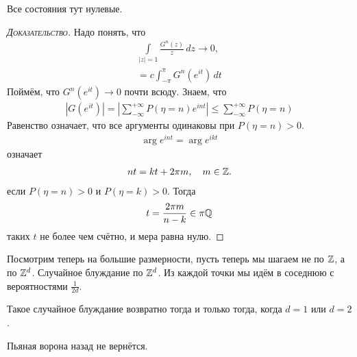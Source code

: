 \documentclass[../main.tex]{subfiles}
\begin{document}
\begin{remrk}
 Все состояния тут нулевые.
\end{remrk}
\begin{proof}[\normalfont\textsc{Доказательство}]
 Надо понять, что
 \begin{align*}
  \int\limits_{\left| z \right|=1} \frac{G^{n}(z)}{z}\,dz \to 0,\\
  = c \int_{-\pi}^{\pi} G^{n}(e^{it})\,dt
 \end{align*} Поймём, что $ G^{n}(e^{it}) \to 0 $ почти всюду. Знаем, что
 \begin{align*}
  \left| G(e^{it}) \right| = \left| \sum_{-\infty}^{+\infty} P(\eta=n)e^{int} \right| \leqslant \sum_{-\infty}^{+\infty} P(\eta = n)
 \end{align*} Равенство означает, что все аргументы одинаковы при $ P(\eta=n)>0 $.
 \begin{align*}
  \arg e^{int} = \arg e^{ikt}
 \end{align*} означает
 \begin{align*}
  nt = kt + 2\pi m, \quad m \in\mathbb{Z}.
 \end{align*} если $ P(\eta=n)>0 $ и $ P(\eta=k)>0 $. Тогда
 \begin{align*}
  t = \frac{2\pi m}{n - k} \in \pi \mathbb{Q}
 \end{align*} таких $ t $ не более чем счётно, и мера равна нулю.
\end{proof}

Посмотрим теперь на большие размерности, пусть теперь мы шагаем не по $ \mathbb{Z} $, а по $ \mathbb{Z}^{d} $. Случайное блуждание по $ \mathbb{Z}^{d} $. Из каждой точки мы идём в соседнюю с вероятностями $ \frac{1}{2d} $.

\begin{thm}
 Такое случайное блуждание возвратно тогда и только тогда, когда $ d=1 $ или $ d=2 $.
\end{thm}

Пьяная ворона назад не вернётся.
\end{document}
